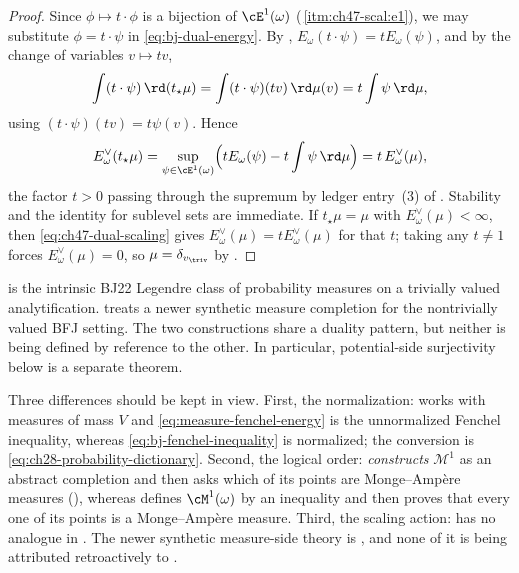 \begin{proof}
Since $\phi\mapsto t\cdot\phi$ is a bijection of $\cE^1(\omega)$
(\,\cref{itm:ch47-scal:e1}), we may substitute
$\phi=t\cdot\psi$ in \eqref{eq:bj-dual-energy}.  By
, $E_\omega(t\cdot\psi)=tE_\omega(\psi)$,
and by the change of variables $v\mapsto tv$,
\[
 \int(t\cdot\psi)\,\rd(t_\star\mu)
 =\int(t\cdot\psi)(tv)\,\rd\mu(v)
 =t\int\psi\,\rd\mu ,
\]
using $(t\cdot\psi)(tv)=t\psi(v)$.  Hence
\[
 E^\vee_\omega(t_\star\mu)
 =\sup_{\psi\in\cE^1(\omega)}
   \Bigl(tE_\omega(\psi)-t\int\psi\,\rd\mu\Bigr)
 =t\,E^\vee_\omega(\mu),
\]
the factor $t>0$ passing through the supremum by ledger entry~(3) of
.  Stability and the identity for sublevel sets are
immediate.  If $t_\star\mu=\mu$ with $E^\vee_\omega(\mu)<\infty$, then
\eqref{eq:ch47-dual-scaling} gives $E^\vee_\omega(\mu)=tE^\vee_\omega(\mu)$
for that $t$; taking any $t\ne1$ forces $E^\vee_\omega(\mu)=0$, so
$\mu=\delta_{v_{\triv}}$ by .
\end{proof}

\begin{remark}
\label{rem:ch47-bfj-comparison}
 is the intrinsic BJ22
Legendre class of probability measures on a trivially valued
analytification.   treats a newer
synthetic measure completion
for the nontrivially valued BFJ setting.  The two constructions share a
duality pattern, but neither is being defined by reference to the other.
In particular, potential-side surjectivity below is a separate theorem.

Three differences should be kept in view.  First, the normalization:
 works with measures of mass $V$ and
\eqref{eq:measure-fenchel-energy} is the unnormalized Fenchel inequality,
whereas \eqref{eq:bj-fenchel-inequality} is normalized; the conversion is
\eqref{eq:ch28-probability-dictionary}.  Second, the logical order:
 \emph{constructs}
$\mathcal M^1$ as an abstract completion and then asks which of its
points are Monge--Amp\`ere measures
(), whereas
 defines $\cM^1(\omega)$ by an
inequality and then proves that every one of its points is a
Monge--Amp\`ere measure.  Third, the scaling action:
 has no analogue in
.  The newer synthetic measure-side
theory is \cite{BJ25FiniteEnergy}, and none of it is being attributed
retroactively to \cite{BJ22}.
\end{remark}

